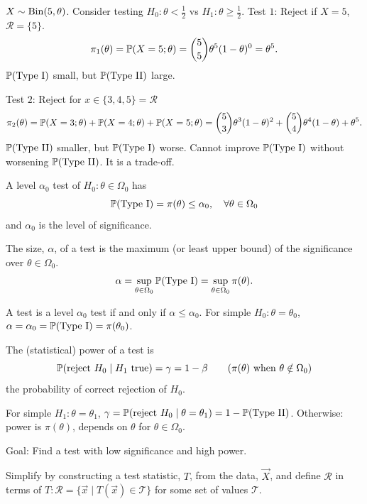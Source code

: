 \documentclass[10pt, a4paper]{article}
\begin{document}
\begin{example}
    $X \sim \Bin(5, \theta)$.
    Consider testing $H_0 : \theta < \frac{1}{2}$ vs $H_1 : \theta \geq \frac{1}{2}$.
    Test $1$:
    Reject if $X = 5$,
    $\mathcal{R} = \{5\}$.
    \[
    \pi_1(\theta) = \P(X = 5; \theta) = \binom{5}{5}\theta ^ 5(1 - \theta) ^ 0 = \theta ^ 5.
    \]
    $\P(\text{Type I})$ small,
    but $\P(\text{Type II})$ large.

    Test $2$:
    Reject for $x \in \{3, 4, 5\} = \mathcal{R}$
    \[
    \pi_2(\theta) = \P(X = 3; \theta) + \P(X = 4; \theta) + \P(X = 5; \theta) = \binom{5}{3}\theta ^ 3(1 - \theta) ^ 2 + \binom{5}{4}\theta ^ 4(1 - \theta) + \theta ^ 5.
    \]
    $\P(\text{Type II})$ smaller,
    but $\P(\text{Type I})$ worse.
    Cannot improve $\P(\text{Type I})$ without worsening $\P(\text{Type II})$.
    It is a trade-off.
\end{example}

\begin{definition}
    A level $\alpha_0$ test of $H_0 : \theta \in \Omega_0$ has
    \[
    \P(\text{Type I}) = \pi(\theta) \leq \alpha_0,\quad\forall \theta \in \Omega_0
    \]
    and $\alpha_0$ is the level of significance.

    The size,
    $\alpha$,
    of a test is the maximum
    (or least upper bound)
    of the significance over $\theta \in \Omega_0$.
    \[
    \alpha = \sup_{\theta \in \Omega_0}\P(\text{Type I}) = \sup_{\theta \in \Omega_0}\pi(\theta).
    \]
\end{definition}
A test is a level $\alpha_0$ test if and only if $\alpha \leq \alpha_0$.
For simple $H_0 : \theta = \theta_0$,
$\alpha = \alpha_0 = \P(\text{Type I}) = \pi(\theta_0)$.

\begin{definition}
    The
    (statistical)
    power of a test is
    \[
    \P(\text{reject } H_0 \mid H_1\text{ true}) = \gamma = 1 - \beta\qquad(\pi(\theta)\text{ when } \theta \notin \Omega_0)
    \]
    the probability of correct rejection of $H_0$.

    For simple $H_1 : \theta = \theta_1$,
    $\gamma = \P(\text{reject }H_0 \mid \theta = \theta_1) = 1 - \P(\text{Type II})$.
    Otherwise:
    power is $\pi(\theta)$,
    depends on $\theta$ for $\theta \in \Omega_0$.
\end{definition}

Goal:
Find a test with low significance and high power.

Simplify by constructing a test statistic,
$T$,
from the data,
$\vec{X}$,
and define $\mathcal{R}$ in terms of $T : \mathcal{R} = \{\vec{x} \mid T(\vec{x}) \in \mathcal{T}\}$ for some set of values $\mathcal{T}$.
\end{document}
